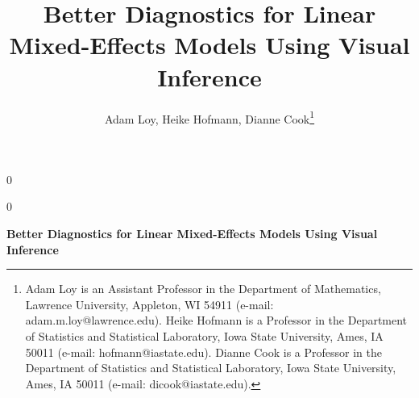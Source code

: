 \documentclass[12pt]{article}
\newcommand{\blind}{0}
\begin{document}
\def\spacingset#1{\renewcommand{\baselinestretch}%
{#1}\small\normalsize} \spacingset{1}


\blind
{
  \title{\bf Better Diagnostics for Linear Mixed-Effects Models Using Visual Inference}
  \author{{Adam Loy, Heike Hofmann, Dianne Cook}\thanks{
    Adam Loy is an Assistant Professor in the Department of Mathematics, Lawrence University, Appleton, WI 54911 (e-mail: adam.m.loy@lawrence.edu). Heike Hofmann is a Professor in the Department of Statistics and Statistical Laboratory, Iowa State University, Ames, IA 50011 (e-mail: hofmann@iastate.edu). Dianne Cook is a Professor in the Department of Statistics and Statistical Laboratory, Iowa State University, Ames, IA 50011 (e-mail: dicook@iastate.edu).}\hspace{.2cm}\\
}
  \maketitle
} \fi

\blind
{
  \bigskip
  \bigskip
  \bigskip
  \begin{center}
    {\LARGE\bf Better Diagnostics for Linear Mixed-Effects Models Using Visual Inference}
\end{center}
  \medskip
} \fi


%
%
\end{document}
